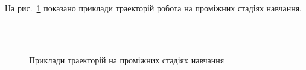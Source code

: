 \documentclass[a4paper,10pt,fleqn]{article}
\begin{document}
На рис.~\ref{fig:samples-samples} показано приклади траекторій робота на проміжних стадіях навчання.

\begin{figure}
  \centering
  \,
   \\
  \,
  \caption{Приклади траекторій на проміжних стадіях навчання}
  \label{fig:samples-samples}
\end{figure}
\end{document}
